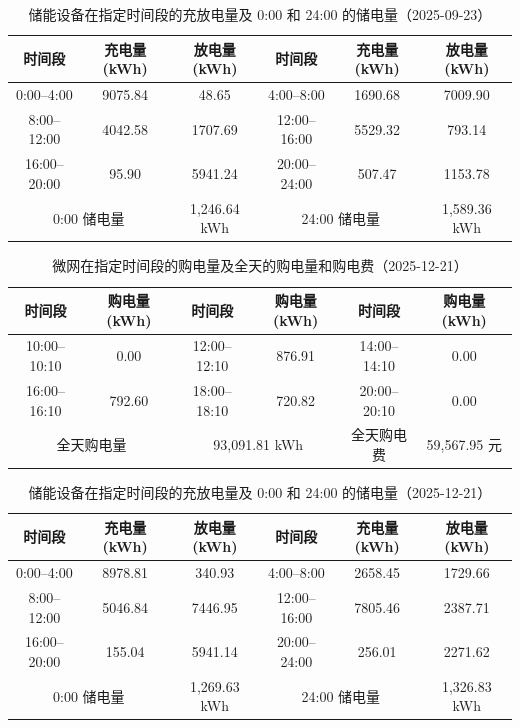\documentclass{cumcmthesis}
\begin{document}
\begin{table}[htbp]
\centering
\caption{储能设备在指定时间段的充放电量及 0:00 和 24:00 的储电量（2025-09-23）}
\label{tab:ess_20250923}
\begin{tabular}{|c|c|c|c|c|c|}
\hline
时间段 & 充电量 (kWh) & 放电量 (kWh) & 时间段 & 充电量 (kWh) & 放电量 (kWh) \\ \hline
0:00--4:00   & 9075.84 & 48.65   & 4:00--8:00   & 1690.68 & 7009.90 \\ \hline
8:00--12:00  & 4042.58 & 1707.69 & 12:00--16:00 & 5529.32 & 793.14  \\ \hline
16:00--20:00 & 95.90   & 5941.24 & 20:00--24:00 & 507.47  & 1153.78 \\ \hline
\multicolumn{2}{|c|}{0:00 储电量} & 1,246.64 kWh & \multicolumn{2}{c|}{24:00 储电量} & 1,589.36 kWh \\ \hline
\end{tabular}
\end{table}
\begin{table}[htbp]
\centering
\caption{微网在指定时间段的购电量及全天的购电量和购电费（2025-12-21）}
\label{tab:grid_20251221}
\begin{tabular}{|c|c|c|c|c|c|}
\hline
时间段 & 购电量 (kWh) & 时间段 & 购电量 (kWh) & 时间段 & 购电量 (kWh) \\ \hline
10:00--10:10 & 0.00   & 12:00--12:10 & 876.91 & 14:00--14:10 & 0.00 \\ \hline
16:00--16:10 & 792.60 & 18:00--18:10 & 720.82 & 20:00--20:10 & 0.00 \\ \hline
\multicolumn{2}{|c|}{全天购电量} & \multicolumn{2}{c|}{93,091.81 kWh} & \multicolumn{1}{c|}{全天购电费} & 59,567.95 元 \\ \hline
\end{tabular}
\end{table}

\begin{table}[htbp]
\centering
\caption{储能设备在指定时间段的充放电量及 0:00 和 24:00 的储电量（2025-12-21）}
\label{tab:ess_20251221}
\begin{tabular}{|c|c|c|c|c|c|}
\hline
时间段 & 充电量 (kWh) & 放电量 (kWh) & 时间段 & 充电量 (kWh) & 放电量 (kWh) \\ \hline
0:00--4:00   & 8978.81 & 340.93  & 4:00--8:00   & 2658.45 & 1729.66 \\ \hline
8:00--12:00  & 5046.84 & 7446.95 & 12:00--16:00 & 7805.46 & 2387.71 \\ \hline
16:00--20:00 & 155.04  & 5941.14 & 20:00--24:00 & 256.01  & 2271.62 \\ \hline
\multicolumn{2}{|c|}{0:00 储电量} & 1,269.63 kWh & \multicolumn{2}{c|}{24:00 储电量} & 1,326.83 kWh \\ \hline
\end{tabular}
\end{table}
\end{document}
